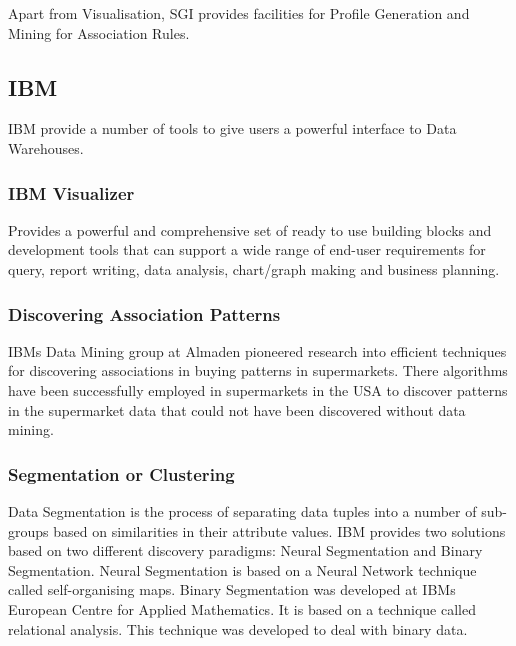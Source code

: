 \documentclass[a4paper,12pt,notitlepage,pdftex]{scrreprt}
\begin{document}
            Apart from Visualisation, SGI provides facilities for Profile Generation and Mining for Association Rules.

        \subsection{IBM}
            IBM provide a number of tools to give users a powerful interface to Data Warehouses.
            \subsubsection{IBM Visualizer}
                Provides a powerful and comprehensive set of ready to use building blocks and development tools that
                can support a wide range of end-user requirements for query, report writing, data analysis,
                chart/graph making and business planning.

            \subsubsection{Discovering Association Patterns}
                IBMs Data Mining group at Almaden pioneered research into efficient techniques for discovering
                associations in buying patterns in supermarkets.
                There algorithms have been successfully employed in supermarkets in the USA to discover patterns in
                the supermarket data that could not have been discovered without data mining.

            \subsubsection{Segmentation or Clustering}
                Data Segmentation is the process of separating data tuples into a number of sub-groups based on
                similarities in their attribute values.
                IBM provides two solutions based on two different discovery paradigms: Neural Segmentation and Binary
                Segmentation.
                Neural Segmentation is based on a Neural Network technique called self-organising maps.
                Binary Segmentation was developed at IBMs European Centre for Applied Mathematics.
                It is based on a technique called relational analysis. This technique was developed to deal with
                binary data.
\end{document}
